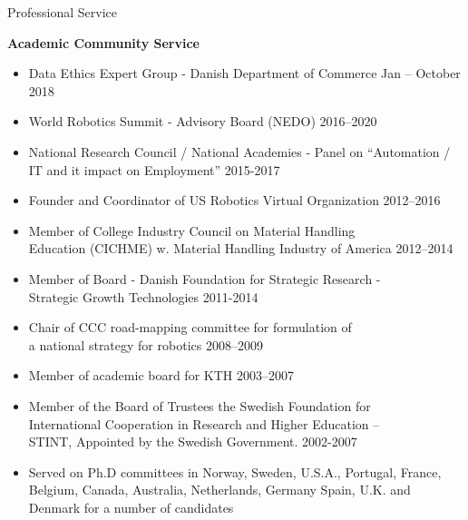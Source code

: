 \documentclass{article}
\begin{document}
\begin{cv}
\begin{cvlist}{Professional Service}%
\item {\bf Academic Community Service}
  \begin{itemize}
  \item Data Ethics Expert Group - Danish Department of Commerce \cftdotfill{\cftdotsep}
    Jan -- October 2018
  \item World Robotics Summit - Advisory Board (NEDO)
    \cftdotfill{\cftdotsep} 2016--2020
  \item National Research Council / National Academies - Panel on
    ``Automation / IT and it impact on Employment''
    \cftdotfill{\cftdotsep} 2015-2017
  \item Founder and Coordinator of US Robotics Virtual Organization
    \cftdotfill{\cftdotsep} 2012--2016
  \item Member of College Industry Council on Material Handling\\
    Education (CICHME) w. Material Handling Industry of America
    \cftdotfill{\cftdotsep} 2012--2014
  \item Member of Board - Danish Foundation for Strategic Research -\\
    Strategic Growth Technologies \cftdotfill{\cftdotsep} 2011-2014
  \item Chair of CCC road-mapping committee for formulation of \\
    a national strategy for robotics \cftdotfill{\cftdotsep}
    2008--2009
  \item Member of academic board for KTH \cftdotfill{\cftdotsep}
    2003--2007
  \item Member of the Board of Trustees the Swedish Foundation for\\
    International Cooperation in Research and Higher Education --\\
    STINT, Appointed by the Swedish Government.
    \cftdotfill{\cftdotsep} 2002-2007
  \item Served on Ph.D committees in Norway, Sweden, U.S.A., Portugal,
    France, Belgium, Canada, Australia, Netherlands, Germany Spain,
    U.K. and Denmark for a number of candidates
  \end{itemize}


\end{cvlist}
\end{cv}
\end{document}
